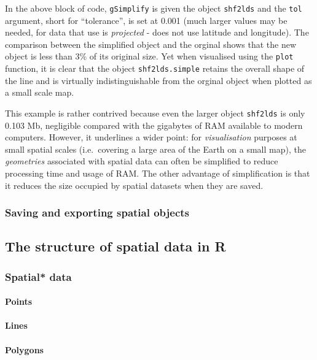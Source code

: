 \documentclass[]{article}
\begin{document}
In the above block of code, \texttt{gSimplify} is given the object
\texttt{shf2lds} and the \texttt{tol} argument, short for ``tolerance'',
is set at 0.001 (much larger values may be needed, for data that use is
\emph{projected} - does not use latitude and longitude). The comparison
between the simplified object and the orginal shows that the new object
is less than 3\% of its original size. Yet when visualised using the
\texttt{plot} function, it is clear that the object
\texttt{shf2lds.simple} retains the overall shape of the line and is
virtually indistinguishable from the orginal object when plotted as a
small scale map.

This example is rather contrived because even the larger object
\texttt{shf2lds} is only 0.103 Mb, negligible compared with the
gigabytes of RAM available to modern computers. However, it underlines a
wider point: for \emph{visualisation} purposes at small spatial scales
(i.e.~covering a large area of the Earth on a small map), the
\emph{geometries} associated with spatial data can often be simplified
to reduce processing time and usage of RAM. The other advantage of
simplification is that it reduces the size occupied by spatial datasets
when they are saved.

\subsubsection{Saving and exporting spatial objects}

\subsection{The structure of spatial data in R}

\subsubsection{Spatial* data}

\paragraph{Points}

\paragraph{Lines}

\paragraph{Polygons}
\end{document}
